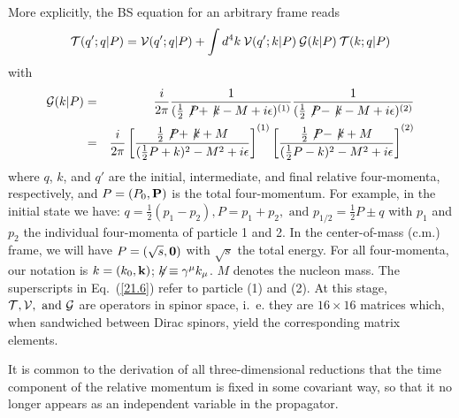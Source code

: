 More explicitly, the BS equation for an arbitrary frame reads~\cite{BD64}
\begin{equation}
{\cal T}(q';q|P)={\cal V}(q';q|P)+\int d^{4}k\: {\cal V}(q';k|P)\: {\cal G}(k|P)
\: {\cal T}(k;q|P)
\label{21.4}
\end{equation}
with
\begin{eqnarray}
{\cal G}(k|P)&=&\frac{i}{2\pi} 
\frac{1}{(\frac{1}{2}\not\!P+\not\!k-M+i\epsilon)^{(1)}}
\frac{1}{(\frac{1}{2}\not\!P-\not\!k-M+i\epsilon)^{(2)}}\\
             &=&\frac{i}{2\pi} 
\left[\frac{\frac{1}{2}\not\!P+\not\!k+M}
{(\frac{1}{2}P+k)^{2}-M^{2}+i\epsilon}\right]^{(1)}
\left[\frac{\frac{1}{2}\not\!P-\not\!k+M}
{(\frac{1}{2}P-k)^{2}-M^{2}+i\epsilon}\right]^{(2)}
\label{21.6}
\end{eqnarray}
where
$q$, $k$, and $q'$ are the initial, intermediate, and final relative
four-momenta, respectively, 
and $P=(P_0,{\bf P})$ is the total four-momentum.
For example, in the initial state we have: $q=\frac12(p_1-p_2), P=p_1+p_2,
\mbox{ and } p_{1/2}=\frac12P\pm q$ with $p_1$ and $p_2$ the individual 
four-momenta of particle 1 and 2.
In the center-of-mass (c.m.) frame, we will have
 $P=(\sqrt{s},{\bf 0})$ with $\sqrt{s}$ the total energy.
For all four-momenta, our notation is
$k=(k_{0},{\bf   k})$; $\not\!\!k \equiv\gamma^{\mu}k_{\mu}$. $M$ denotes the
nucleon mass.
 The superscripts in Eq.~(\ref{21.6})
refer to particle (1) and (2). 
At this stage, ${\cal T, V,\mbox{ and } G}$ are operators in spinor 
space, i.~e. they are 
$16\times 16$ matrices which, when sandwiched between Dirac 
spinors, yield the corresponding matrix elements.

It is common to the derivation of all three-dimensional reductions that the 
time component of the relative momentum is fixed in some covariant way, so 
that it no longer appears as an independent variable in the propagator.

